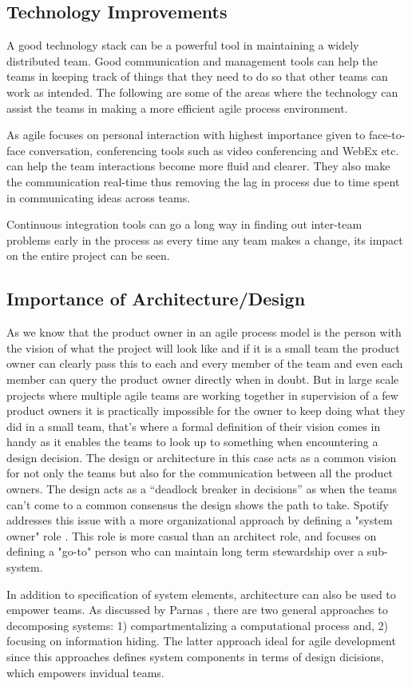 \subsection{Technology Improvements} 
\label{sec:tech_impv}
	A good technology stack can be a powerful tool in maintaining a widely distributed team.
	Good communication and management tools can help the teams in keeping track of things that they need to do so that other teams can work as intended.
	The following are some of the areas where the technology can assist the teams in making a more efficient agile process environment.

As agile focuses on personal interaction with highest importance given to face-to-face conversation, conferencing tools such as video conferencing and WebEx etc. can help the team interactions become more fluid and clearer.
They also make the communication real-time thus removing the lag in process due to time spent in communicating ideas across teams.

Continuous integration tools can go a long way in finding out inter-team problems early in the process as every time any team makes a change, its impact on the entire project can be seen.

\subsection{Importance of Architecture/Design}\label{sec:imp_of_dsgn}

As we know that the product owner in an agile process model is the person with the vision of what the project will look like and if it is a small team the product owner can clearly pass this to each and every member of the team and even each member can query the product owner directly when in doubt.
But in large scale projects where multiple agile teams are working together in supervision of a few product owners it is practically impossible for the owner to keep doing what they did in a small team, that’s where a formal definition of their vision comes in handy as it enables the teams to look up to something when encountering a design decision.
The design or architecture in this case acts as a common vision for not only the teams but also for the communication between all the product owners.
The design acts as a “deadlock breaker in decisions” \cite{architecureRole_article} as when the teams can’t come to a common consensus the design shows the path to take.
Spotify addresses this issue with a more organizational approach by defining a "system owner" role \cite{kniberg12}.
This role is more casual than an architect role, and focuses on defining a "go-to" person who can maintain long term stewardship over a sub-system. 

In addition to specification of system elements, architecture can also be used to empower teams.
As discussed by Parnas \cite{Parnas72}, there are two general approaches to decomposing systems: 1) compartmentalizing a computational process and, 2) focusing on information hiding.
The latter approach ideal for agile development since this approaches defines system components in terms of design dicisions, which empowers invidual teams.